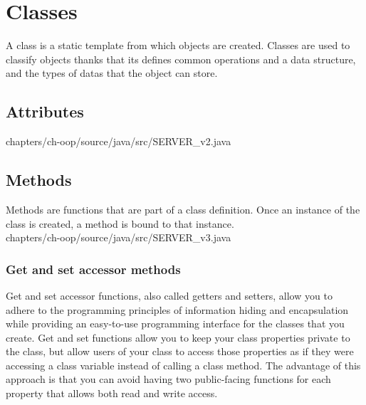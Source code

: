 \section{Classes}

A class is a static 
template from which objects are 
created. Classes are used 
to classify objects thanks 
that its defines 
common operations 
and a data structure, 
and the types of 
datas that the object can 
store.\\


%



\subsection{Attributes}
	
	{chapters/ch-oop/source/java/src/SERVER_v2.java}



\subsection{Methods}
Methods are functions that are part of a class 
definition. Once an instance of the class is created, 
a method is bound to that instance.\\
	
	{chapters/ch-oop/source/java/src/SERVER_v3.java}



	\subsubsection{Get and set accessor methods}
	Get and set accessor functions, also called getters 
	and setters, allow you to adhere to the programming principles of 
	information hiding and encapsulation while providing an 
	easy-to-use programming interface for the classes that you 
	create. Get and set functions allow you to keep your class 
	properties private to the class, but allow users of your class 
	to access those properties as if they were accessing a 
	class variable instead of calling a class method. 
	The advantage of this approach is that you can avoid 
	having two public-facing functions for each property 
	that allows both read and write access. \\

